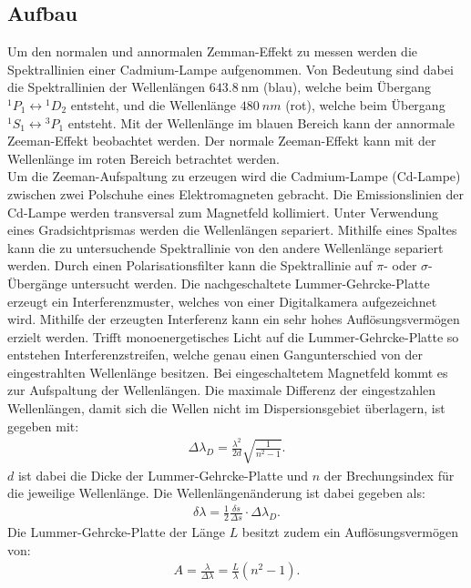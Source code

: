 \subsection{Aufbau}
Um den normalen und annormalen Zemman-Effekt zu messen werden die Spektrallinien einer Cadmium-Lampe aufgenommen.
Von Bedeutung sind dabei die Spektrallinien der Wellenlängen $\SI{643.8}{\nano\meter}$ (blau), welche beim Übergang ${}^1P_1\leftrightarrow{}^1D_2$ entsteht, und
die Wellenlänge $\SI{480}{nm}$ (rot), welche beim Übergang ${}^1S_1\leftrightarrow{}^3P_1$ entsteht.
Mit der Wellenlänge im blauen Bereich kann der annormale Zeeman-Effekt beobachtet werden.
Der normale Zeeman-Effekt kann mit der Wellenlänge im roten Bereich betrachtet werden.\\
%
Um die Zeeman-Aufspaltung zu erzeugen wird die Cadmium-Lampe (Cd-Lampe) zwischen zwei Polschuhe eines Elektromagneten gebracht.
Die Emissionslinien der Cd-Lampe werden transversal zum Magnetfeld kollimiert.
Unter Verwendung eines Gradsichtprismas werden die Wellenlängen separiert.
Mithilfe eines Spaltes kann die zu untersuchende Spektrallinie von den andere Wellenlänge separiert werden.
Durch einen Polarisationsfilter kann die Spektrallinie auf $\pi$- oder $\sigma$- Übergänge untersucht werden.
Die nachgeschaltete Lummer-Gehrcke-Platte erzeugt ein Interferenzmuster, welches von einer Digitalkamera aufgezeichnet wird.
Mithilfe der erzeugten Interferenz kann ein sehr hohes Auflösungsvermögen erzielt werden.
Trifft monoenergetisches Licht auf die Lummer-Gehrcke-Platte so entstehen Interferenzstreifen, welche genau einen Gangunterschied von der eingestrahlten Wellenlänge besitzen.
Bei eingeschaltetem Magnetfeld kommt es zur Aufspaltung der Wellenlängen.
Die maximale Differenz der eingestzahlen Wellenlängen, damit sich die Wellen nicht im Dispersionsgebiet überlagern, ist gegeben mit:
\begin{align}
	\Delta \lambda_D =\frac{\lambda^2}{2d}\sqrt{\frac{1}{n^2-1}}.
	\label{eqn:dispersionsgebiet}
\end{align}
$d$ ist dabei die Dicke der Lummer-Gehrcke-Platte und $n$ der Brechungsindex für die jeweilige Wellenlänge.
Die Wellenlängenänderung ist dabei gegeben als:
\begin{align}
  \delta \lambda = \frac{1}{2}\frac{\delta s}{\Delta s}\cdot \Delta\lambda_D.
	\label{eqn:wellenlänge}
\end{align}
Die Lummer-Gehrcke-Platte der Länge $L$ besitzt zudem ein Auflösungsvermögen von:
\begin{align}
 A=\frac{\lambda}{\Delta\lambda}=\frac{L}{\lambda}(n^2-1).
 \label{eqn:auflösung}
\end{align}
\FloatBarrier


